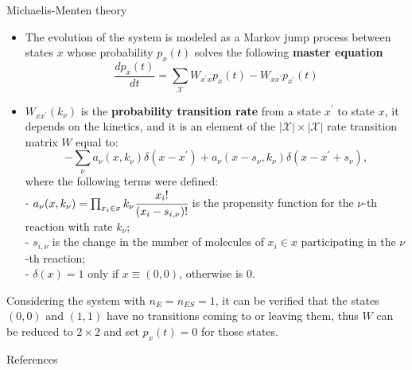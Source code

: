 \documentclass[final]{beamer}
\newlength{\colwidth}
\begin{document}
\begin{frame}[t]
\begin{columns}[t]
\begin{column}{\colwidth}
\begin{block}{Michaelis-Menten theory}
\begin{itemize}
\justifying
\item The evolution of the system is modeled as a Markov jump process between states $x$ whose probability $p_x(t)$ solves the following {\bf master equation}\cite{van2007stochastic,GILLESPIE1976403}
%
\begin{equation}
\frac{dp_{x}(t)}{dt} = \sum_{\mathcal{X}} W_{x^\prime x} p_{x}(t) -  W_{x x^\prime}p_{x^\prime}(t) \label{eq CME}
\end{equation}
\item $W_{x x^\prime }(k_\nu)$ is the {\bf probability transition rate} from a state $x^\prime$ to state $x$, it depends on the kinetics, and it is an element of the $|\mathcal{X}|\times|\mathcal{X}|$ rate transition matrix $W$ equal to\cite{Munsky_2006}:
\begin{equation*}
-\sum_\nu a_\nu({x},k_\nu) \delta(x - x^\prime) + a_\nu({x} - s_\nu,k_\nu) \delta(x - x^\prime + s_\nu),
\end{equation*}
\vskip-20pt
where the following terms were defined:\\

- $a_\nu({x},k_\nu) = \prod_{x_i \in x} k_\nu \cfrac{{x_i}!}{({x}_{i} - s_{i,\nu})!}$ is the propensity function for the $\nu$-th reaction with rate $k_\nu$;\\

- $s_{i,\nu} $ is the change in the number of molecules of $x_i \in x$ participating in the $\nu$-th reaction;\\
- $\delta(x) = 1$ only if $x \equiv (0,0)$, otherwise is $0$.
%
\end{itemize}
%

Considering the system with $n_E=n_{ES}=1$, it can be verified that the states $(0,0)$ and $(1,1)$ have no transitions coming to or leaving them, thus $W$ can be reduced to $2 \times 2$ and set $p_x(t) = 0$ for those states. 
\end{block}


\begin{alertblock}{References}


\end{alertblock}
\end{column}
\end{columns}
\end{frame}
\end{document}
